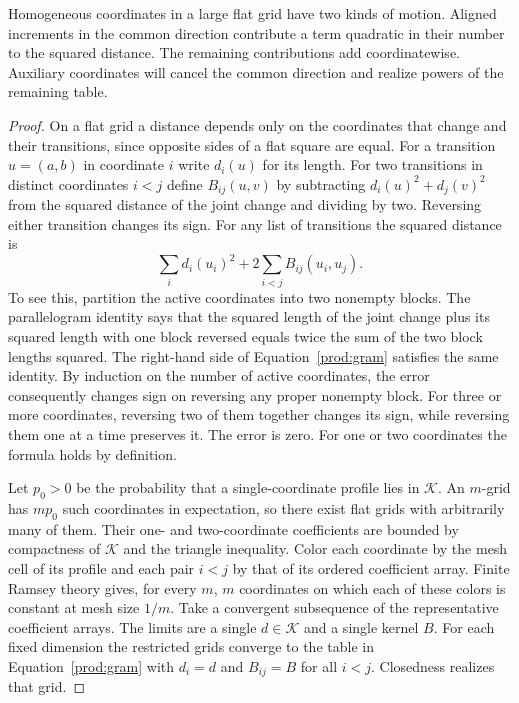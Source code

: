 Homogeneous coordinates in a large flat grid have two kinds of motion.
Aligned increments in the common direction contribute a term quadratic
in their number to the squared distance. The remaining contributions
add coordinatewise. Auxiliary coordinates will cancel the common
direction and realize powers of the remaining table.

\begin{proof}
On a flat grid a distance depends only on the coordinates that change and
their transitions, since opposite sides of a flat square are equal. For a
transition $u=(a,b)$ in coordinate $i$ write $d_i(u)$ for its length.
For two transitions in distinct coordinates $i<j$ define $B_{ij}(u,v)$
by subtracting $d_i(u)^2+d_j(v)^2$ from the squared distance of the joint
change and dividing by two. Reversing either transition changes its sign.
For any list of transitions the squared distance is
\begin{equation}\label{prod:gram}
 \sum_i d_i(u_i)^2+2\sum_{i<j} B_{ij}(u_i,u_j).
\end{equation}
To see this, partition the active coordinates into two nonempty blocks.
The parallelogram identity says that the squared length of the joint
change plus its squared length with one block reversed equals twice
the sum of the two block lengths squared. The right-hand side of
Equation~\eqref{prod:gram} satisfies the same identity. By induction on
the number of active coordinates, the error consequently changes sign
on reversing any proper nonempty block. For three or more coordinates,
reversing two of them together changes its sign, while reversing them
one at a time preserves it. The error is zero. For one or two coordinates
the formula holds by definition.

Let $p_0>0$ be the probability that a single-coordinate profile lies
in $\mathcal K$. An $m$-grid has $mp_0$ such coordinates in expectation,
so there exist flat grids with arbitrarily many of them. Their
one- and two-coordinate coefficients are bounded by compactness of
$\mathcal K$ and the triangle inequality. Color each coordinate by the
mesh cell of its profile and each pair $i<j$ by that of its ordered
coefficient array. Finite Ramsey theory gives, for every $m$, $m$
coordinates on which each of these colors is constant at mesh size
$1/m$. Take a convergent subsequence of the representative coefficient
arrays. The limits are a single $d\in\mathcal K$ and a single kernel $B$.
For each fixed dimension the restricted grids converge to the table
in Equation~\eqref{prod:gram} with $d_i=d$ and $B_{ij}=B$ for
all $i<j$. Closedness realizes that grid.


\end{proof}
